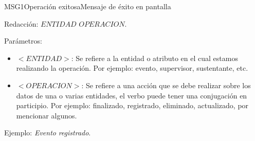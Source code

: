 \begin{mensaje}{MSG1}{Operación exitosa}{Mensaje de éxito en pantalla}
  
      
        \item[Redacción:] $ENTIDAD$ $OPERACION$.
    
        \item[Parámetros:] 
        \begin{itemize}
            \item $<ENTIDAD>$: Se refiere a la entidad o atributo en el cual estamos realizando la operación. Por ejemplo: evento, supervisor, sustentante, etc.
            \item $<OPERACION>$: Se refiere a una acción que se debe realizar sobre los datos de una o varias entidades, el verbo puede tener una conjugación en participio. Por ejemplo: finalizado, registrado, eliminado, actualizado, por mencionar algunos.
        \end{itemize}   
    
        \item[Ejemplo:] \textit{Evento} \textit{registrado}.
    \end{mensaje}

